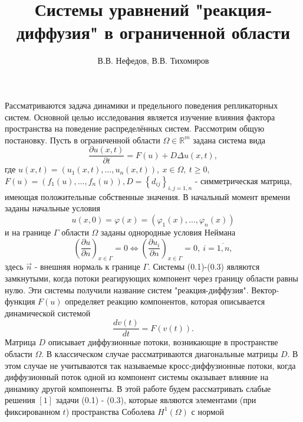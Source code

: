 \documentclass[9pt, a4paper]{extarticle}
\title{Системы уравнений "реакция-диффузия" в ограниченной области}
\author{В.В. Нефедов, В.В. Тихомиров}
\numberwithin{equation}{section}
\numberwithin{lemma}{section}
\numberwithin{definition}{section}
\numberwithin{notabene}{section}
\numberwithin{corollary}{section}
\begin{document}
	\maketitle
	Рассматриваются задача динамики и предельного поведения репликаторных систем. Основной целью исследования является изучение влияния фактора пространства на поведение распределённых систем. Рассмотрим общую постановку.\newline
	Пусть в ограниченной области $\Omega \in \mathbb{R}^m$ задана система вида
	\begin{equation}
		\dfrac{\partial u(x,t)}{\partial t} = F(u) + D \Delta u(x,t),
	\end{equation}
	где $u(x,t) = \left(u_1(x,t), \dots, u_n(x,t)\right),\ x \in \Omega, \ t \geq 0,$ \newline $ F(u) = \left(f_1(u), \dots, f_n(u)\right),$\newline $D = \left\{d_{ij}\right\}_{i,j=\overline{1,n}}$ - симметрическая матрица, имеющая положительные собственные значения. \newline
	В начальный момент времени заданы начальные условия
	\begin{equation}
		u(x,0) = \varphi(x) = \left(\varphi_1(x), \dots, \varphi_n(x)\right)
	\end{equation}
	и на границе $\Gamma$ области $\Omega$ заданы однородные условия Неймана
	\begin{equation}
		\left(\dfrac{\partial u}{\partial n}\right)_{x \in \Gamma} = 0 \Leftrightarrow \left(\dfrac{\partial u_i}{\partial n}\right)_{x \in \Gamma} = 0, \ i = \overline{1,n},
	\end{equation}
	здесь $\vec{n}$ -  внешняя нормаль к границе $\Gamma$.\newline
	Системы (0.1)-(0.3) являются замкнутыми, когда потоки реагирующих компонент через границу области равны нулю. Эти системы получили название систем "реакция-диффузия". Вектор-функция $F(u)$ определяет реакцию компонентов, которая описывается динамической системой
	\begin{equation*}
		\dfrac{dv(t)}{dt} = F(v(t)).
	\end{equation*}
	Матрица $D$ описывает диффузионные потоки, возникающие в пространстве области $\Omega$. В классическом случае рассматриваются диагональные матрицы $D$. В этом случае не учитываются так называемые кросс-диффузионные потоки, когда диффузионный поток одной из компонент системы оказывает влияние на динамику другой компоненты. \newline
	В этой работе будем рассматривать слабые решения $[1]$ задачи (0.1) - (0.3), которые являются элементами (при фиксированном $t$) пространства Соболева $H^1(\Omega)$ с нормой
\end{document}
